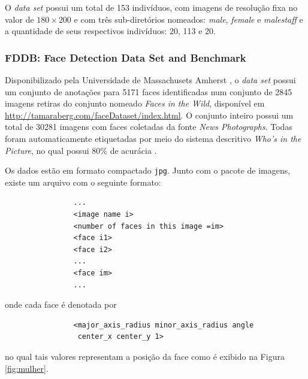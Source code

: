 \documentclass[10pt, conference]{IEEEtran}
\begin{document}
			O \textit{data set} possui um total de 153 indivíduos, com imagens de resolução fixa no valor de $ 180 \times 200 $ e com três sub-diretórios nomeados: \textit{male}, \textit{female} e \textit{malestaff} e a quantidade de seus respectivos indivíduos: 20, 113 e 20.


		\subsubsection{FDDB: Face Detection Data Set and Benchmark} \label{sec:FDDB}
			Disponibilizado pela Universidade de Massachusets Amherst \cite{fddbTech}, o \textit{data set} possui um conjunto de anotações para 5171 faces identificadas num conjunto de 2845 imagens retiras do conjunto nomeado \textit{Faces in the Wild}, disponível em \url{http://tamaraberg.com/faceDataset/index.html}. O conjunto inteiro possui um total de 30281 imagens com faces coletadas da fonte \textit{News Photographs}. Todas foram automaticamente etiquetadas por meio do sistema descritivo \textit{Who's in the Picture}, no qual possui 80\% de acurácia \cite{berg2004s}.

			Os dados estão em formato compactado \texttt{jpg}. Junto com o pacote de imagens, existe um arquivo com o seguinte formato:

			\begin{verbatim}
				...
				<image name i>
				<number of faces in this image =im>
				<face i1>
				<face i2>
				...
				<face im>
				...
			\end{verbatim}

			onde cada face é denotada por

			\begin{verbatim}
				<major_axis_radius minor_axis_radius angle
				 center_x center_y 1>
			\end{verbatim}

			no qual tais valores representam a posição da face como é exibido na Figura \ref{fig:mulher}.
\end{document}

